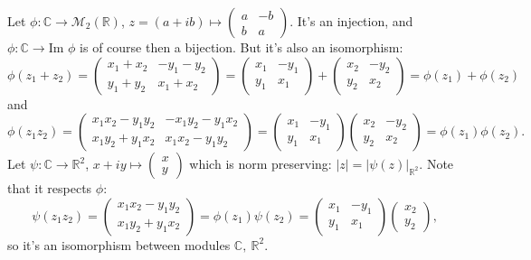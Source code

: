 \documentclass[a4paper]{article}
\theoremstyle{definition}
\begin{document}
Let $\phi: \mathbb C \rightarrow \mathcal M_2(\mathbb R)$, $z=(a+ib) \mapsto \begin{pmatrix} a & -b \\ b & a \end{pmatrix}$. It's an injection, and $\phi: \mathbb C \rightarrow \text{Im } \phi$ is of course then a bijection. But it's also an isomorphism:
\[
\phi (z_1+z_2) = \begin{pmatrix}
x_1+x_2 & -y_1-y_2 \\ y_1+y_2 & x_1+x_2
\end{pmatrix} = \begin{pmatrix}
x_1 & -y_1 \\ y_1 & x_1
\end{pmatrix} + \begin{pmatrix}
x_2 & -y_2 \\ y_2 & x_2
\end{pmatrix} = \phi(z_1) + \phi(z_2)
\]
and
\[
\phi(z_1 z_2) = \begin{pmatrix}
x_1x_2-y_1y_2 & -x_1y_2-y_1x_2 \\ x_1y_2+y_1x_2 & x_1x_2-y_1y_2
\end{pmatrix} = \begin{pmatrix}
x_1 & -y_1 \\ y_1 & x_1
\end{pmatrix} \begin{pmatrix}
x_2 & -y_2 \\ y_2 & x_2
\end{pmatrix} = \phi(z_1) \phi(z_2) .
\]
Let $\psi : \mathbb C \rightarrow \mathbb R^2$, $x+iy \mapsto \begin{pmatrix}x\\y\end{pmatrix}$ which is norm preserving: $|z|=|\psi(z)|_{\mathbb R^2}$. Note that it respects $\phi$:
\[
\psi(z_1 z_2) = \begin{pmatrix}
x_1x_2-y_1y_2 \\ x_1y_2+y_1x_2
\end{pmatrix} =\phi(z_1) \psi(z_2) = \begin{pmatrix}
x_1 & -y_1 \\ y_1 & x_1
\end{pmatrix}\begin{pmatrix} x_2 \\ y_2 \end{pmatrix},
\]
so it's an isomorphism between modules $\mathbb C,\ \mathbb R^2$.
\end{document}
